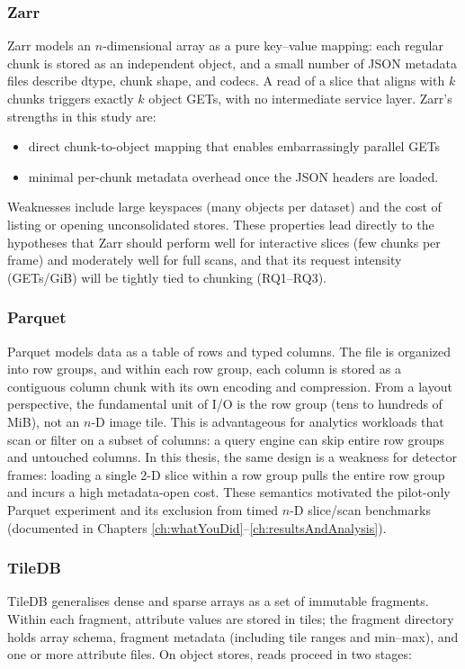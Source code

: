 \documentclass[nomenclature, english, bibtex]{kththesis}
\numberwithin{listing}{chapter}
\begin{document}
\subsubsection{Zarr}
Zarr models an $n$-dimensional array as a pure key–value mapping: each regular chunk is stored as an independent object, and a small number of \gls{JSON} metadata files describe dtype, chunk shape, and codecs. A read of a slice that aligns with $k$ chunks triggers exactly $k$ object GETs, with no intermediate service layer. Zarr’s strengths in this study are:

\begin{itemize}
    \item direct chunk-to-object mapping that enables embarrassingly parallel GETs
    \item minimal per-chunk metadata overhead once the \gls{JSON} headers are loaded.
\end{itemize}

Weaknesses include large keyspaces (many objects per dataset) and the cost of listing or opening unconsolidated stores. These properties lead directly to the hypotheses that Zarr should perform well for interactive slices (few chunks per frame) and moderately well for full scans, and that its request intensity (GETs/GiB) will be tightly tied to chunking (RQ1–RQ3).

\subsubsection{Parquet}
Parquet models data as a table of rows and typed columns. The file is organized into row groups, and within each row group, each column is stored as a contiguous column chunk with its own encoding and compression. From a layout perspective, the fundamental unit of I/O is the row group (tens to hundreds of MiB), not an $n$-D image tile. This is advantageous for analytics workloads that scan or filter on a subset of columns: a query engine can skip entire row groups and untouched columns. In this thesis, the same design is a weakness for detector frames: loading a single 2-D slice within a row group pulls the entire row group and incurs a high metadata-open cost. These semantics motivated the pilot-only Parquet experiment and its exclusion from timed $n$-D slice/scan benchmarks (documented in Chapters \ref{ch:whatYouDid}–\ref{ch:resultsAndAnalysis}).

\subsubsection{TileDB}
TileDB generalises dense and sparse arrays as a set of immutable fragments. Within each fragment, attribute values are stored in tiles; the fragment directory holds array schema, fragment metadata (including tile ranges and min–max), and one or more attribute files. On object stores, reads proceed in two stages:
\end{document}
